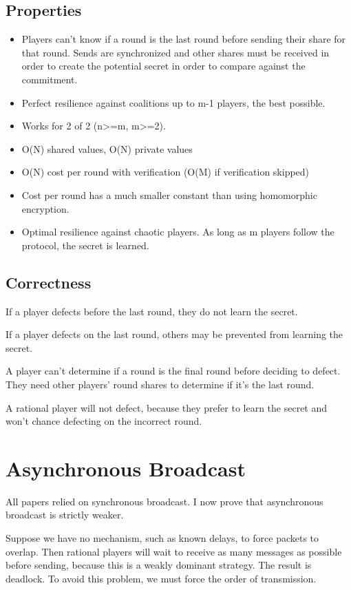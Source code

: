 \documentclass{article}
\begin{document}
\subsection{Properties}
\begin{itemize}
	\item Players can't know if a round is the last round before sending their share for that round.
	\subitem Sends are synchronized and other shares must be received in order to create the potential secret in order to compare against the commitment.
	\item Perfect resilience against coalitions up to m-1 players, the best possible.
	\item Works for 2 of 2 (n>=m, m>=2).
	\item O(N) shared values, O(N) private values
	\item O(N) cost per round with verification (O(M) if verification skipped)
	\item Cost per round has a much smaller constant than using homomorphic encryption.
	\item Optimal resilience against chaotic players. As long as m players follow the protocol, the secret is learned.
\end{itemize}

\subsection{Correctness}

If a player defects before the last round, they do not learn the secret.

If a player defects on the last round, others may be prevented from learning the secret.

A player can't determine if a round is the final round before deciding to defect. They need other players' round shares to determine if it's the last round.

A rational player will not defect, because they prefer to learn the secret and won't chance defecting on the incorrect round.

\section{Asynchronous Broadcast}

All papers relied on synchronous broadcast. I now prove that asynchronous broadcast is strictly weaker.

Suppose we have no mechanism, such as known delays, to force packets to overlap. Then rational players will wait to receive as many messages as possible before sending, because this is a weakly dominant strategy. The result is deadlock. To avoid this problem, we must force the order of transmission.
\end{document}
